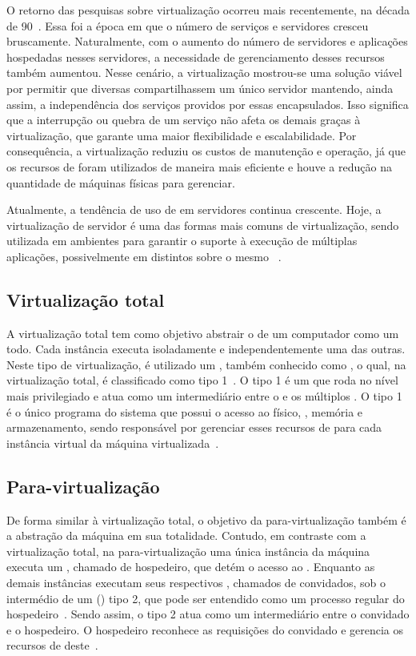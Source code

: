 O retorno das pesquisas sobre virtualização ocorreu mais recentemente, na década de 90~\cite{campbell2006introduction}. Essa foi a época em que o número de serviços e servidores cresceu bruscamente. Naturalmente, com o aumento do número de servidores e aplicações hospedadas nesses servidores, a necessidade de gerenciamento desses recursos também aumentou. Nesse cenário, a virtualização mostrou-se uma solução viável por permitir que diversas \vms compartilhassem um único servidor mantendo, ainda assim, a independência dos serviços providos por essas \vms encapsulados. Isso significa que a interrupção ou quebra de um serviço não afeta os demais graças à virtualização, que garante uma maior flexibilidade e escalabilidade. Por consequência, a virtualização reduziu os custos de manutenção e operação, já que os recursos de \hardware foram utilizados de maneira mais eficiente e houve a redução na quantidade de máquinas físicas para gerenciar.

Atualmente, a tendência de uso de \vms em servidores continua crescente. Hoje, a virtualização de servidor é uma das formas mais comuns de virtualização, sendo utilizada em ambientes \cloud para garantir o suporte à execução de múltiplas aplicações, possivelmente em \oss distintos sobre o mesmo \hardware~\cite{manohar2013survey}.

\subsection{Virtualização total}
A virtualização total tem como objetivo abstrair o \hardware de um computador como um todo. Cada instância executa isoladamente e independentemente uma das outras. Neste tipo de virtualização, é utilizado um \vmm, também conhecido como \hypervisor, o qual, na virtualização total, é classificado como tipo 1~\cite{campbell2006introduction}. O \hypervisor tipo 1 é um \software que roda no nível mais privilegiado e atua como um intermediário entre o \hardware e os múltiplos \sos. O \hypervisor tipo 1 é o único programa do sistema que possui o acesso ao \hardware físico, \eg \cpu, memória e armazenamento, sendo responsável por gerenciar esses recursos de \hardware para cada instância virtual da máquina virtualizada~\cite{sweeney2016virtualization}.

\subsection{Para-virtualização}
De forma similar à virtualização total, o objetivo da para-virtualização também é a abstração da máquina em sua totalidade. Contudo, em contraste com a virtualização total, na para-virtualização uma única instância da máquina executa um \so, chamado de \so hospedeiro, que detém o acesso ao \hardware. Enquanto as demais instâncias executam seus respectivos \sos, chamados de \sos convidados, sob o intermédio de um \hypervisor (\vmm) tipo 2, que pode ser entendido como um processo regular do \so hospedeiro~\cite{campbell2006introduction}. Sendo assim, o \hypervisor tipo 2 atua como um intermediário entre o \so convidado e o \so hospedeiro. O \so hospedeiro reconhece as requisições do \so convidado e gerencia os recursos de \hardware deste~\cite{sweeney2016virtualization}.

